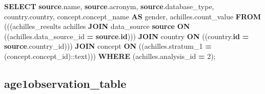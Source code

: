\documentclass[
]{book}
\newenvironment{Shaded}{\begin{snugshade}}{\end{snugshade}}
\newcommand{\CharTok}[1]{\textcolor[rgb]{0.31,0.60,0.02}{#1}}
\newcommand{\DecValTok}[1]{\textcolor[rgb]{0.00,0.00,0.81}{#1}}
\newcommand{\KeywordTok}[1]{\textcolor[rgb]{0.13,0.29,0.53}{\textbf{#1}}}
\newcommand{\NormalTok}[1]{#1}
\newcommand{\OperatorTok}[1]{\textcolor[rgb]{0.81,0.36,0.00}{\textbf{#1}}}
\begin{document}
\begin{Shaded}
\begin{Highlighting}[]
\KeywordTok{SELECT} \KeywordTok{source}\NormalTok{.name,}
   \KeywordTok{source}\NormalTok{.acronym,}
   \KeywordTok{source}\NormalTok{.database\_type,}
\NormalTok{   country.country,}
\NormalTok{   concept.concept\_name }\KeywordTok{AS}\NormalTok{ gender,}
\NormalTok{   achilles.count\_value}
  \KeywordTok{FROM}\NormalTok{ (((achilles\_results achilles}
    \KeywordTok{JOIN}\NormalTok{ data\_source }\KeywordTok{source} \KeywordTok{ON}\NormalTok{ ((achilles.data\_source\_id }\OperatorTok{=} \KeywordTok{source}\NormalTok{.}\KeywordTok{id}\NormalTok{)))}
    \KeywordTok{JOIN}\NormalTok{ country }\KeywordTok{ON}\NormalTok{ ((country.}\KeywordTok{id} \OperatorTok{=} \KeywordTok{source}\NormalTok{.country\_id)))}
    \KeywordTok{JOIN}\NormalTok{ concept }\KeywordTok{ON}\NormalTok{ ((achilles.stratum\_1 }\OperatorTok{=}\NormalTok{ (concept.concept\_id):}\CharTok{:text}\NormalTok{)))}
 \KeywordTok{WHERE}\NormalTok{ (achilles.analysis\_id }\OperatorTok{=} \DecValTok{2}\NormalTok{);}
\end{Highlighting}
\end{Shaded}

\hypertarget{age1observation_table}{%
\subsection*{age1observation\_table}\label{age1observation_table}}
\end{document}

